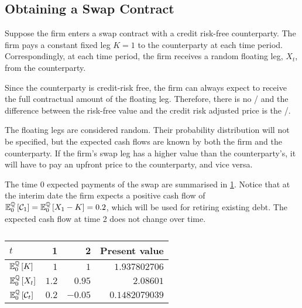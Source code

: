 \documentclass[main.tex]{subfiles}
\begin{document}
    \subsection{Obtaining a Swap Contract}
        Suppose the firm enters a swap contract with a credit risk-free counterparty.
        The firm pays a constant fixed leg $K=\num{1}$ to the counterparty at each time period.
        Correspondingly, at each time period,
        the firm receives a random floating leg, $X_t$, from the counterparty.

        Since the counterparty is credit-risk free,
        the firm can always expect to receive the full contractual amount of the floating leg.
        Therefore, there is no \CVA/ and
        the difference between the risk-free value and the credit risk adjusted price is the \DVA/.

        The floating legs are considered random.
        Their probability distribution will not be specified,
        but the expected cash flows are known
        by both the firm and the counterparty.
        If the firm's swap leg has a higher value than the counterparty's,
        it will have to pay an upfront price to the counterparty,
        and vice versa.

        The time 0 expected payments of the swap are summarised in \cref{tbl:swap-legs}.
        Notice that at the interim date the firm expects a positive cash flow of
        $\mathbb{E}_{0}^{\mathbb{Q}}\left[\mathcal{C}_1\right] = \mathbb{E}_{0}^{\mathbb{Q}}\left[X_1 - K\right] = \num{0.2}$,
        which will be used for retiring existing debt.
        The expected cash flow at time 2 does not change over time.

        \begin{table}[H]
            \centering
            \begin{tabular}{l|rr||r}
                $t$ & 1 & 2 & Present value \\
                \hline
                \rule{0pt}{1.1em}
                $\mathbb{E}_{0}^{\mathbb{Q}}\left[K\right]$ & $\num{1}$ & $\num{1}$ & $\num{1.937802706}$ \\
                \rule{0pt}{1.1em}
                $\mathbb{E}_{0}^{\mathbb{Q}}\left[X_t\right]$ & $\num{1.2}$ & $\num{0.95}$ & $\num{2.08601}$ \\
                \rule{0pt}{1.1em}
                $\mathbb{E}_{0}^{\mathbb{Q}}\left[\mathcal{C}_t\right]$ & $\num{0.2}$ & $\num{-0.05}$ & $\num{0.1482079039}$ \\
            \end{tabular}
            \caption{}
            \label{tbl:swap-legs}
        \end{table}
\end{document}
